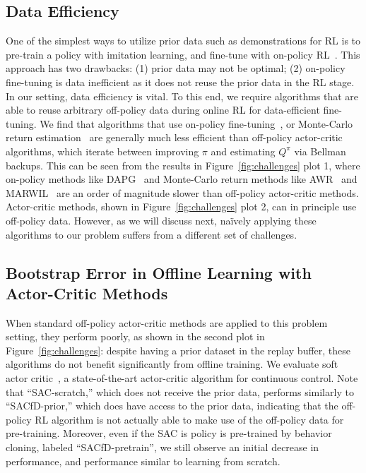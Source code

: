 \documentclass[conference]{IEEEtran}
\begin{document}
\subsection{Data Efficiency} \label{sec:challenges_efficiency}
One of the simplest ways to utilize prior data such as demonstrations for RL is to pre-train a policy with imitation learning, and fine-tune with on-policy RL~\citep{gupta2019relay, rajeswaran2018dextrous}. This approach has two drawbacks: (1) prior data may not be optimal; (2) on-policy fine-tuning is data inefficient as it does not reuse the prior data in the RL stage. In our setting, data efficiency is vital. To this end, we require algorithms that are able to reuse arbitrary off-policy data during online RL for data-efficient fine-tuning. We find that algorithms that use on-policy fine-tuning~\citep{rajeswaran2018dextrous, gupta2019relay}, or Monte-Carlo return estimation~\citep{peters2007rwr, wang2018marwil, peng2019awr} are generally much less efficient than off-policy actor-critic algorithms, which iterate between improving $\pi$ and estimating $Q^\pi$ via Bellman backups. This can be seen from the results in Figure~\ref{fig:challenges} plot 1, where on-policy methods like DAPG~\citep{rajeswaran2018dextrous} and Monte-Carlo return methods like AWR~\citep{peng2019awr} and MARWIL~\citep{wang2018marwil} are an order of magnitude slower than off-policy actor-critic methods. Actor-critic methods, shown in Figure~\ref{fig:challenges} plot 2, can in principle use off-policy data. However, as we will discuss next, na\"{i}vely applying these algorithms to our problem suffers from a different set of challenges. 

\subsection{Bootstrap Error in Offline Learning with Actor-Critic Methods} \label{sec:challenges_sac}
When standard off-policy actor-critic methods are applied to this problem setting, they perform poorly, as shown in the second plot in Figure~\ref{fig:challenges}: despite having a prior dataset in the replay buffer, these algorithms do not benefit significantly from offline training.
We evaluate soft actor critic~\citep{haarnoja2018sac}, a state-of-the-art actor-critic algorithm for continuous control.
Note that ``SAC-scratch,'' which does not receive the prior data, performs similarly to ``SACfD-prior,'' which does have access to the prior data, indicating that the off-policy RL algorithm is not actually able to make use of the off-policy data for pre-training.
Moreover, even if the SAC is policy is pre-trained by behavior cloning, labeled ``SACfD-pretrain'', we still observe an initial decrease in performance, and performance similar to learning from scratch.
\end{document}
